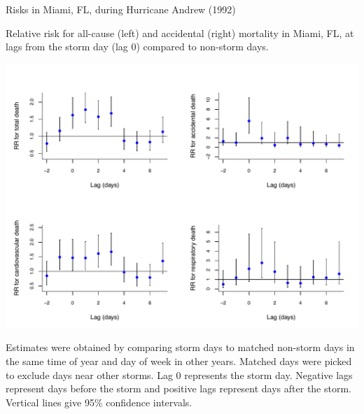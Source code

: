 \documentclass[ignorenonframetext,]{beamer}
\begin{document}
\begin{frame}{Risks in Miami, FL, during Hurricane Andrew (1992)}

\begin{centering}
\small Relative risk for all-cause (left) and accidental (right) mortality in Miami, FL, at lags from the storm day (lag 0) compared to non-storm days.
\end{centering}

\includegraphics{miami_andrew_2.pdf}

\vspace{-0.2cm} \scriptsize Estimates were obtained by comparing storm
days to matched non-storm days in the same time of year and day of week
in other years. Matched days were picked to exclude days near other
storms. Lag 0 represents the storm day. Negative lags represent days
before the storm and positive lags represent days after the storm.
Vertical lines give 95\% confidence intervals.

\end{frame}
\end{document}
